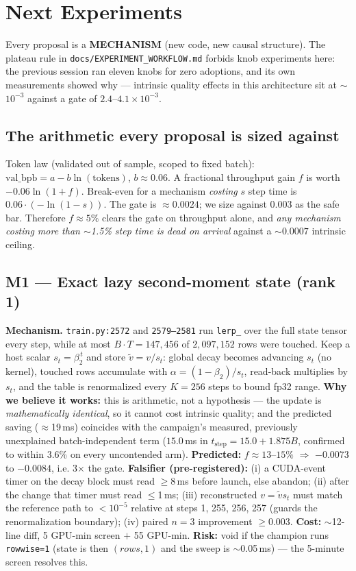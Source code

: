 \documentclass{article}
\newcommand{\vb}{\mathrm{val\_bpb}}
\begin{document}
\section{Next Experiments}
Every proposal is a \textbf{MECHANISM} (new code, new causal structure). The plateau rule in \texttt{docs/EXPERIMENT\_WORKFLOW.md} forbids knob experiments here: the previous session ran eleven knobs for zero adoptions, and its own measurements showed why --- intrinsic quality effects in this architecture sit at $\sim$$10^{-3}$ against a gate of $2.4$--$4.1\times10^{-3}$.

\subsection{The arithmetic every proposal is sized against}
Token law (validated out of sample, scoped to fixed batch): $\vb = a - b\ln(\mathrm{tokens})$, $b\approx0.06$. A fractional throughput gain $f$ is worth $-0.06\ln(1+f)$. Break-even for a mechanism \emph{costing} $s$ step time is $0.06\cdot(-\ln(1-s))$. The gate is $\approx$$0.0024$; we size against $0.003$ as the safe bar. Therefore $f\approx5\%$ clears the gate on throughput alone, and \emph{any mechanism costing more than $\sim$1.5\% step time is dead on arrival} against a $\sim$$0.0007$ intrinsic ceiling.

\subsection{M1 --- Exact lazy second-moment state (rank 1)}
\textbf{Mechanism.} \texttt{train.py:2572} and \texttt{2579--2581} run \texttt{lerp\_} over the full state tensor every step, while at most $B\!\cdot\!T=147{,}456$ of $2{,}097{,}152$ rows were touched. Keep a host scalar $s_t=\beta_2^{\,t}$ and store $\tilde v = v/s_t$: global decay becomes advancing $s_t$ (no kernel), touched rows accumulate with $\alpha=(1-\beta_2)/s_t$, read-back multiplies by $s_t$, and the table is renormalized every $K{=}256$ steps to bound fp32 range. \textbf{Why we believe it works:} this is arithmetic, not a hypothesis --- the update is \emph{mathematically identical}, so it cannot cost intrinsic quality; and the predicted saving ($\approx$19\,ms) coincides with the campaign's measured, previously unexplained batch-independent term ($15.0$\,ms in $t_\mathrm{step}=15.0+1.875B$, confirmed to within 3.6\% on every uncontended arm).
\textbf{Predicted:} $f\approx13$--$15\%$ $\Rightarrow$ $-0.0073$ to $-0.0084$, i.e. 3$\times$ the gate.
\textbf{Falsifier (pre-registered):} (i) a CUDA-event timer on the decay block must read $\ge$8\,ms before launch, else abandon; (ii) after the change that timer must read $\le$1\,ms; (iii) reconstructed $v=\tilde v s_t$ must match the reference path to $<$$10^{-5}$ relative at steps 1, 255, 256, 257 (guards the renormalization boundary); (iv) paired $n{=}3$ improvement $\ge$$0.003$.
\textbf{Cost:} $\sim$12-line diff, 5 GPU-min screen $+$ 55 GPU-min. \textbf{Risk:} void if the champion runs \texttt{rowwise=1} (state is then $(rows,1)$ and the sweep is $\sim$0.05\,ms) --- the 5-minute screen resolves this.
\end{document}
